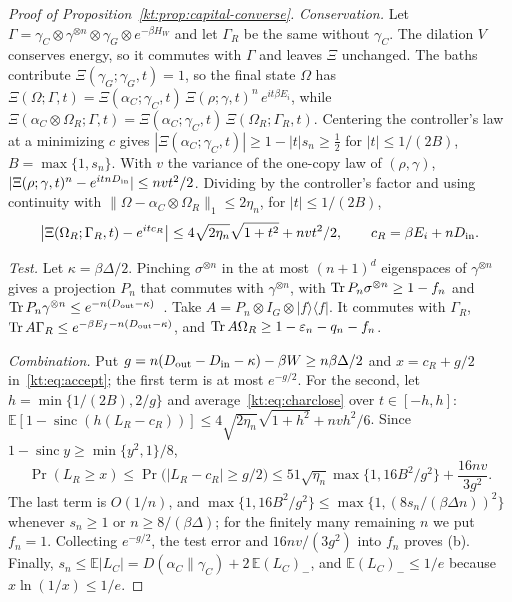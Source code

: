 \begin{proof}[Proof of Proposition~\ref{kt:prop:capital-converse}]
\emph{Conservation.} Let $\Gamma=\gamma_C\otimes\gamma^{\otimes n}\otimes\gamma_G\otimes e^{-\beta H_W}$ and let $\Gamma_R$ be the same without $\gamma_C$. The dilation $V$ conserves energy, so it commutes with $\Gamma$ and leaves $\Xi$ unchanged. The baths contribute $\Xi(\gamma_G;\gamma_G,t)=1$, so the final state $\Omega$ has
$\Xi(\Omega;\Gamma,t)=\Xi(\alpha_C;\gamma_C,t)\,\Xi(\rho;\gamma,t)^n\,e^{it\beta E_i}$, while $\Xi(\alpha_C\otimes\Omega_R;\Gamma,t)=\Xi(\alpha_C;\gamma_C,t)\,\Xi(\Omega_R;\Gamma_R,t)$. Centering the controller's law at a minimizing $c$ gives $|\Xi(\alpha_C;\gamma_C,t)|\ge1-|t|s_n\ge\tfrac12$ for $|t|\le1/(2B)$, $B=\max\{1,s_n\}$. With $v$ the variance of the one-copy law of $(\rho,\gamma)$, $|\Xi(\rho;\gamma,t)^n-e^{itnD_{\rm in}}|\le nvt^2/2$. Dividing by the controller's factor and using continuity with $\|\Omega-\alpha_C\otimes\Omega_R\|_1\le2\eta_n$, for $|t|\le1/(2B)$,
\begin{equation}\label{kt:eq:charclose}
\bigl|\Xi(\Omega_R;\Gamma_R,t)-e^{itc_R}\bigr|\le4\sqrt{2\eta_n}\sqrt{1+t^2}+nvt^2/2,\qquad c_R=\beta E_i+nD_{\rm in}.
\end{equation}

\emph{Test.} Let $\kappa=\beta\Delta/2$. Pinching $\sigma^{\otimes n}$ in the at most $(n+1)^{d}$ eigenspaces of $\gamma^{\otimes n}$ gives a projection $P_n$ that commutes with $\gamma^{\otimes n}$, with $\operatorname{Tr} P_n\sigma^{\otimes n}\ge1-f_n$ and $\operatorname{Tr} P_n\gamma^{\otimes n}\le e^{-n(D_{\rm out}-\kappa)}$~\cite{Hayashi02}. Take $A=P_n\otimes I_G\otimes|f\rangle\langle f|$. It commutes with $\Gamma_R$, $\operatorname{Tr} A\Gamma_R\le e^{-\beta E_f-n(D_{\rm out}-\kappa)}$, and $\operatorname{Tr} A\Omega_R\ge1-\varepsilon_n-q_n-f_n$.

\emph{Combination.} Put $g=n(D_{\rm out}-D_{\rm in}-\kappa)-\beta W\ge n\beta\Delta/2$ and $x=c_R+g/2$ in~\eqref{kt:eq:accept}; the first term is at most $e^{-g/2}$. For the second, let $h=\min\{1/(2B),2/g\}$ and average~\eqref{kt:eq:charclose} over $t\in[-h,h]$: $\mathbb E[1-\operatorname{sinc}(h(L_R-c_R))]\le4\sqrt{2\eta_n}\sqrt{1+h^2}+nvh^2/6$. Since $1-\operatorname{sinc}y\ge\min\{y^2,1\}/8$,
\[
\Pr(L_R\ge x)\le\Pr\bigl(|L_R-c_R|\ge g/2\bigr)\le51\sqrt{\eta_n}\max\{1,16B^2/g^2\}+\frac{16nv}{3g^2}.
\]
The last term is $O(1/n)$, and $\max\{1,16B^2/g^2\}\le\max\{1,(8s_n/(\beta\Delta n))^2\}$ whenever $s_n\ge1$ or $n\ge8/(\beta\Delta)$; for the finitely many remaining $n$ we put $f_n=1$. Collecting $e^{-g/2}$, the test error and $16nv/(3g^2)$ into $f_n$ proves (b). Finally, $s_n\le\mathbb E|L_C|=D(\alpha_C\|\gamma_C)+2\,\mathbb E(L_C)_-$, and $\mathbb E(L_C)_-\le1/e$ because $x\ln(1/x)\le1/e$.


\end{proof}
